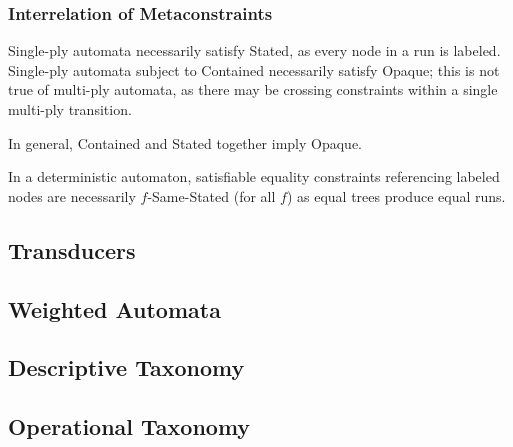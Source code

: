\subsubsection{Interrelation of Metaconstraints}

Single-ply automata necessarily satisfy Stated, as every node in a run is
labeled.  Single-ply automata subject to Contained necessarily satisfy
Opaque; this is not true of multi-ply automata, as there may be crossing
constraints within a single multi-ply transition.

In general, Contained and Stated together imply Opaque.

In a deterministic automaton, satisfiable equality constraints referencing
labeled nodes are necessarily $f$-Same-Stated (for all $f$) as equal trees
produce equal runs.

\subsection{Transducers}

\subsection{Weighted Automata}

\subsection{Descriptive Taxonomy}

\subsection{Operational Taxonomy}
